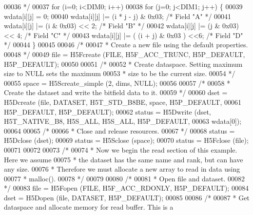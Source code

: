 \begin{DoxyCode}
00036 \textcolor{comment}{     */}
00037     \textcolor{keywordflow}{for} (i=0; i<DIM0; i++)
00038         \textcolor{keywordflow}{for} (j=0; j<DIM1; j++) \{
00039             wdata[i][j] = 0;
00040             wdata[i][j] |= (i * j - j) & 0x03;          \textcolor{comment}{/* Field "A" */}
00041             wdata[i][j] |= (i & 0x03) << 2;             \textcolor{comment}{/* Field "B" */}
00042             wdata[i][j] |= (j & 0x03) << 4;             \textcolor{comment}{/* Field "C" */}
00043             wdata[i][j] |= ( (i + j) & 0x03 ) <<6;      \textcolor{comment}{/* Field "D" */}
00044         \}
00045 
00046     \textcolor{comment}{/*}
00047 \textcolor{comment}{     * Create a new file using the default properties.}
00048 \textcolor{comment}{     */}
00049     file = H5Fcreate (FILE, H5F\_ACC\_TRUNC, H5P\_DEFAULT, H5P\_DEFAULT);
00050 
00051     \textcolor{comment}{/*}
00052 \textcolor{comment}{     * Create dataspace.  Setting maximum size to NULL sets the maximum}
00053 \textcolor{comment}{     * size to be the current size.}
00054 \textcolor{comment}{     */}
00055     space = H5Screate\_simple (2, dims, NULL);
00056 
00057     \textcolor{comment}{/*}
00058 \textcolor{comment}{     * Create the dataset and write the bitfield data to it.}
00059 \textcolor{comment}{     */}
00060     dset = H5Dcreate (file, DATASET, H5T\_STD\_B8BE, space, H5P\_DEFAULT,
00061                 H5P\_DEFAULT, H5P\_DEFAULT);
00062     status = H5Dwrite (dset, H5T\_NATIVE\_B8, H5S\_ALL, H5S\_ALL, H5P\_DEFAULT,
00063                 wdata[0]);
00064 
00065     \textcolor{comment}{/*}
00066 \textcolor{comment}{     * Close and release resources.}
00067 \textcolor{comment}{     */}
00068     status = H5Dclose (dset);
00069     status = H5Sclose (space);
00070     status = H5Fclose (file);
00071 
00072 
00073     \textcolor{comment}{/*}
00074 \textcolor{comment}{     * Now we begin the read section of this example.  Here we assume}
00075 \textcolor{comment}{     * the dataset has the same name and rank, but can have any size.}
00076 \textcolor{comment}{     * Therefore we must allocate a new array to read in data using}
00077 \textcolor{comment}{     * malloc().}
00078 \textcolor{comment}{     */}
00079 
00080     \textcolor{comment}{/*}
00081 \textcolor{comment}{     * Open file and dataset.}
00082 \textcolor{comment}{     */}
00083     file = H5Fopen (FILE, H5F\_ACC\_RDONLY, H5P\_DEFAULT);
00084     dset = H5Dopen (file, DATASET, H5P\_DEFAULT);
00085 
00086     \textcolor{comment}{/*}
00087 \textcolor{comment}{     * Get dataspace and allocate memory for read buffer.  This is a}

\end{DoxyCode}
